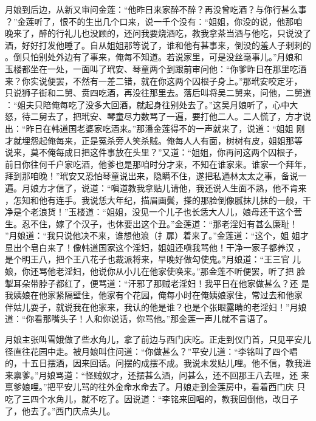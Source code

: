 月娘到后边，从新又审问金莲：“他昨日来家醉不醉？再没曾吃酒？与你行甚么事
？”金莲听了，恨不的生出几个口来，说一千个没有：“姐姐，你没的说，他那咱
晚来了，醉的行礼儿也没顾的，还问我要烧酒吃，教我拿茶当酒与他吃，只说没了
酒，好好打发他睡了。自从姐姐那等说了，谁和他有甚事来，倒没的羞人子剌剌的
。倒只怕别处外边有了事来，俺每不知道。若说家里，可是没丝毫事儿。”月娘和
玉楼都坐在一处，一面叫了玳安、琴童两个到跟前审问他：“你爹昨日在那里吃酒
来？你实说便罢，不然有一差二错，就在你这两个囚根子身上。”那玳安咬定牙，
只说狮子街和二舅、贲四吃酒，再没往那里去。落后叫将吴二舅来，问他，二舅道
：“姐夫只陪俺每吃了没多大回酒，就起身往别处去了。”这吴月娘听了，心中大
怒，待二舅去了，把玳安、琴童尽力数骂了一遍，要打他二人。二人慌了，方才说
出：“昨日在韩道国老婆家吃酒来。”那潘金莲得不的一声就来了，说道：“姐姐
刚才就埋怨起俺每来，正是冤杀旁人笑杀贼。俺每人人有面，树树有皮，姐姐那等
说来，莫不俺每成日把这件事放在头里？”又道：“姐姐，你再问这两个囚根子，
前日你往何千户家吃酒，他爹也是那咱时分才来，不知在谁家来。谁家一个拜年，
拜到那咱晚！”玳安又恐怕琴童说出来，隐瞒不住，遂把私通林太太之事，备说一
遍。月娘方才信了，说道：“嗔道教我拿贴儿请他，我还说人生面不熟，他不肯来
，怎知和他有连手。我说恁大年纪，描眉画鬓，搽的那脸倒像腻抹儿抹的一般，干
净是个老浪货！”玉楼道：“姐姐，没见一个儿子也长恁大人儿，娘母还干这个营
生。忍不住，嫁了个汉子，也休要出这个丑。”金莲道：“那老淫妇有甚么廉耻！
”月娘道：“我只说他决不来，谁想他浪（扌扉）着来了。”金莲道：“这个，姐
姐才显出个皂白来了！像韩道国家这个淫妇，姐姐还嗔我骂他！干净一家子都养汉
，是个明王八，把个王八花子也裁派将来，早晚好做勾使鬼。”月娘道：“王三官
儿娘，你还骂他老淫妇，他说你从小儿在他家使唤来。”那金莲不听便罢，听了把
脸掣耳朵带脖子都红了，便骂道：“汗邪了那贼老淫妇！我平日在他家做甚么？还
是我姨娘在他家紧隔壁住，他家有个花园，俺每小时在俺姨娘家住，常过去和他家
伴姑儿耍子，就说我在他家来，我认的他是谁？也是个张眼露睛的老淫妇！”月娘
道：“你看那嘴头子！人和你说话，你骂他。”那金莲一声儿就不言语了。

月娘主张叫雪娥做了些水角儿，拿了前边与西门庆吃。正走到仪门首，只见平安儿
径直往花园中走。被月娘叫住问道：“你做甚么？”平安儿道：“李铭叫了四个唱
的，十五日摆酒，因来回话。问摆的成摆不成。我说未发贴儿哩。他不信，教我进
来禀爹。”月娘骂道：“怪贼奴才，还摆甚么酒，问甚么，还不回那王八去哩，还
来禀爹娘哩。”把平安儿骂的往外金命水命去了。月娘走到金莲房中，看着西门庆
只吃了三四个水角儿，就不吃了。因说道：“李铭来回唱的，教我回倒他，改日子
了，他去了。”西门庆点头儿。

